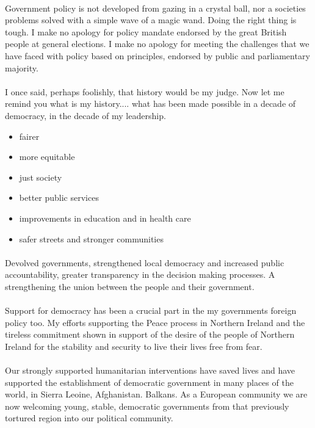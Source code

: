 \documentclass[14pt]{article}
\begin{document}
\begin{onehalfspace}
\paragraph{}Government policy is not developed from gazing in a crystal ball, nor a societies problems solved with a simple wave of a magic wand. Doing the right thing is tough. I make no apology for policy mandate endorsed by the great British people at general elections. I make no apology for meeting the challenges that we have faced with policy based on principles, endorsed by public and parliamentary majority.

\newpage
\paragraph{}I once said, perhaps foolishly, that history would be my judge. Now let me remind you what is my history.... what has been made possible in a decade of democracy, in the decade of my leadership.

\begin{itemize}
\item fairer
\item more equitable
\item just society
\item better public services
\item improvements in education and in health care
\item safer streets and stronger communities
\end{itemize}


\paragraph{}Devolved governments, strengthened local democracy and increased public accountability, greater transparency in the decision making processes. A strengthening the union between the people and their government.

\paragraph{}Support for democracy has been a crucial part in the my governments foreign policy too. My efforts supporting the Peace process in Northern Ireland and the tireless commitment shown in support of the desire of the people of Northern Ireland for the stability and security to live their lives free from fear.

\paragraph{}Our strongly supported humanitarian interventions have saved lives and have supported the establishment of democratic government in many places of the world, in Sierra Leoine, Afghanistan. Balkans. As a European community we are now welcoming young, stable, democratic governments from that previously tortured region into our political community.


\end{onehalfspace}
\end{document}
